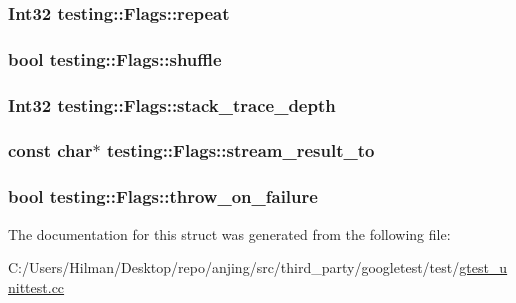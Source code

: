 \subsubsection[{repeat}]{\setlength{\rightskip}{0pt plus 5cm}Int32 testing\+::\+Flags\+::repeat}\label{structtesting_1_1_flags_a61614dd07f97f6e04d27c004ff15195e}
\hypertarget{structtesting_1_1_flags_a51c689e47e0f55c16116ac2a1d3b05d6}{}
\subsubsection[{shuffle}]{\setlength{\rightskip}{0pt plus 5cm}bool testing\+::\+Flags\+::shuffle}\label{structtesting_1_1_flags_a51c689e47e0f55c16116ac2a1d3b05d6}
\hypertarget{structtesting_1_1_flags_a20c6592453909c1adace64bf6a2bc2de}{}
\subsubsection[{stack\+\_\+trace\+\_\+depth}]{\setlength{\rightskip}{0pt plus 5cm}Int32 testing\+::\+Flags\+::stack\+\_\+trace\+\_\+depth}\label{structtesting_1_1_flags_a20c6592453909c1adace64bf6a2bc2de}
\hypertarget{structtesting_1_1_flags_ab09849fd3e095d5628dec65ec4dce9e1}{}
\subsubsection[{stream\+\_\+result\+\_\+to}]{\setlength{\rightskip}{0pt plus 5cm}const char$\ast$ testing\+::\+Flags\+::stream\+\_\+result\+\_\+to}\label{structtesting_1_1_flags_ab09849fd3e095d5628dec65ec4dce9e1}
\hypertarget{structtesting_1_1_flags_ab8e7d21e31e641efe47b8050759e001a}{}
\subsubsection[{throw\+\_\+on\+\_\+failure}]{\setlength{\rightskip}{0pt plus 5cm}bool testing\+::\+Flags\+::throw\+\_\+on\+\_\+failure}\label{structtesting_1_1_flags_ab8e7d21e31e641efe47b8050759e001a}


The documentation for this struct was generated from the following file\+:\begin{DoxyCompactItemize}
\item 
C\+:/\+Users/\+Hilman/\+Desktop/repo/anjing/src/third\+\_\+party/googletest/test/\hyperlink{gtest__unittest_8cc}{gtest\+\_\+unittest.\+cc}\end{DoxyCompactItemize}

